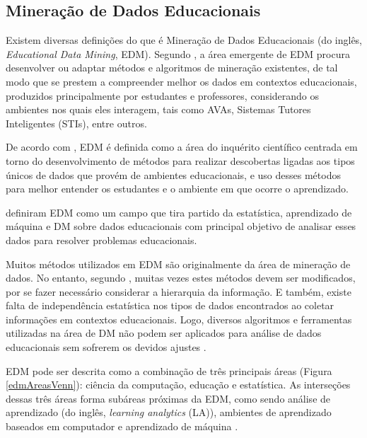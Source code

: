 \subsection{Mineração de Dados Educacionais}

Existem diversas definições do que é Mineração de Dados Educacionais (do inglês,
\textit{Educational Data Mining}, EDM). Segundo
, a área emergente de EDM procura desenvolver ou
adaptar métodos e algoritmos de mineração existentes, de tal modo que se prestem
a compreender melhor os dados em contextos educacionais, produzidos
principalmente por estudantes e professores, considerando os ambientes nos quais
eles interagem, tais como AVAs, Sistemas Tutores Inteligentes (STIs), entre
outros.

De acordo com , EDM é definida como a área do
inquérito científico centrada em torno do desenvolvimento de métodos para
realizar descobertas ligadas aos tipos únicos de dados que provém de ambientes
educacionais, e uso desses métodos para melhor entender os estudantes e o
ambiente em que ocorre o aprendizado.

 definiram EDM como um campo que tira partido
da estatística, aprendizado de máquina e DM sobre dados educacionais com
principal objetivo de analisar esses dados  para resolver problemas
educacionais.

Muitos métodos utilizados em EDM são originalmente da área de mineração de
dados. No entanto, segundo , muitas vezes estes
métodos devem ser modificados, por se fazer necessário considerar a hierarquia
da informação. E também, existe falta de independência estatística nos tipos de
dados encontrados ao coletar informações em contextos educacionais. Logo,
diversos algoritmos e ferramentas utilizadas na área de DM não podem ser
aplicados para análise de dados educacionais sem sofrerem os devidos ajustes
\cite{baker2011mineraccao,costa2012mineraccao}.

EDM pode ser descrita como a combinação de três principais áreas (Figura
\ref{edmAreasVenn}): ciência da computação, educação e estatística. As
interseções dessas três áreas forma subáreas próximas da EDM, como sendo análise
de aprendizado (do inglês, \textit{learning analytics} (LA)), ambientes de
aprendizado baseados em computador e aprendizado de máquina
\cite{romero2013data}.


